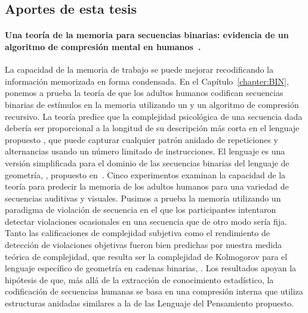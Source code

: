 \subsection{Aportes de esta tesis}

\paragraph{Una teoría de la memoria para secuencias binarias: evidencia de un algoritmo de compresión mental en humanos~\cite{planton2021memory}.} 
La capacidad de la memoria de trabajo se puede mejorar recodificando la información memorizada en forma condensada. En el Capítulo~\ref{chapter:BIN}, ponemos a prueba la teoría de que los adultos humanos codifican secuencias binarias de estímulos en la memoria utilizando un \lot y un algoritmo de compresión recursivo. La teoría predice que la complejidad psicológica de una secuencia dada debería ser proporcional a la longitud de su descripción más corta en el lenguaje propuesto \grambin, que puede capturar cualquier patrón anidado de repeticiones y alternancias usando un número limitado de instrucciones. El lenguaje \grambin es una versión simplificada para el dominio de las secuencias binarias del lenguaje de geometría, \gramgeo, propuesto en~\cite{amalric2017language}. Cinco experimentos examinan la capacidad de la teoría para predecir la memoria de los adultos humanos para una variedad de secuencias auditivas y visuales. Pusimos a prueba la memoria utilizando un paradigma de violación de secuencia en el que los participantes intentaron detectar violaciones ocasionales en una secuencia que de otro modo sería fija. Tanto las calificaciones de complejidad subjetiva como el rendimiento de detección de violaciones objetivas fueron bien predichas por nuestra medida teórica de complejidad, que resulta ser la complejidad de Kolmogorov para el lenguaje específico de geometría en cadenas binarias, \grambin. Los resultados apoyan la hipótesis de que, más allá de la extracción de conocimiento estadístico, la codificación de secuencias humanas se basa en una compresión interna que utiliza estructuras anidadas similares a la de las Lenguaje del Pensamiento propuesto.


